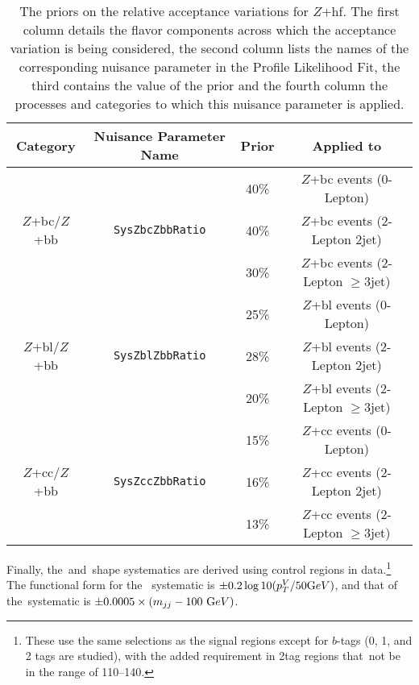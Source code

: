 \begin{table}[!htbp]\captionsetup{justification=centering}
\begin{center}
\begin{tabular}{c|c|c|c}
        \hline
        \hline
         Category & Nuisance Parameter Name & Prior & Applied to\\ 
        \hline
        \multirow{ 3}{*}{$Z$+bc/$Z$+bb} & \multirow{ 3}{*}{\texttt{SysZbcZbbRatio}}  & 40\% & $Z$+bc events (0-Lepton)\\
                                                            &								    & 40\% & $Z$+bc events (2-Lepton 2jet)\\
							  &								    & 30\% & $Z$+bc events (2-Lepton $\geq$3jet)\\		
        \hline
        \multirow{ 3}{*}{$Z$+bl/$Z$+bb} & \multirow{ 3}{*}{\texttt{SysZblZbbRatio}}     & 25\% & $Z$+bl events (0-Lepton)\\
                                                            &								    & 28\% & $Z$+bl events (2-Lepton 2jet)\\
							  &								    & 20\% & $Z$+bl events (2-Lepton $\geq$3jet)\\	
	\hline
        \multirow{ 3}{*}{$Z$+cc/$Z$+bb} & \multirow{ 3}{*}{\texttt{SysZccZbbRatio}}    & 15\% & $Z$+cc events (0-Lepton)\\
                                                            &								    &  16\% & $Z$+cc events (2-Lepton 2jet)\\
							  &								    &   13\% & $Z$+cc events (2-Lepton $\geq$3jet)\\	
        \hline
        \hline
\end{tabular}
\caption{The priors on the relative acceptance variations for $Z$+hf. The first column details the flavor components across which the acceptance variation is being considered, the second column lists the names of the corresponding nuisance parameter in the Profile Likelihood Fit, the third contains the value of the prior and the fourth column the processes and categories to which this nuisance parameter is applied.}
\label{tab:zhf}
\end{center}
\end{table}

Finally, the \ptv\,and \mbb\,shape systematics are derived using control regions in data.\footnote{These use the same selections as the signal regions except for $b$-tags (0, 1, and 2 tags are studied), with the added requirement in 2tag regions that \mbb\,not be in the range of 110--140\GeV.}  The functional form for the \ptv\, systematic is $\pm 0.2 \log10 (p_T^V/50 {\text GeV})$, and that of the \mbb \,systematic is $\pm 0.0005 \times (m_{jj}-100~{\text GeV})$.

